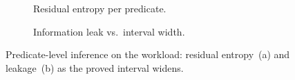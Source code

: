
\begin{figure}[!t]
  \centering
  \begin{subfigure}{0.49\textwidth}
    \centering
    \resizebox{\linewidth}{!}{}
    \caption{Residual entropy per predicate.}
    \label{fig:entropy}
  \end{subfigure}\hfill
  \begin{subfigure}{0.49\textwidth}
    \centering
    \resizebox{\linewidth}{!}{}
    \caption{Information leak vs.\ interval width.}
    \label{fig:leak}
  \end{subfigure}
  \caption{Predicate-level inference on the workload: residual entropy~(a) and
  leakage~(b) as the proved interval widens.}
  \label{fig:inference}
\end{figure}

